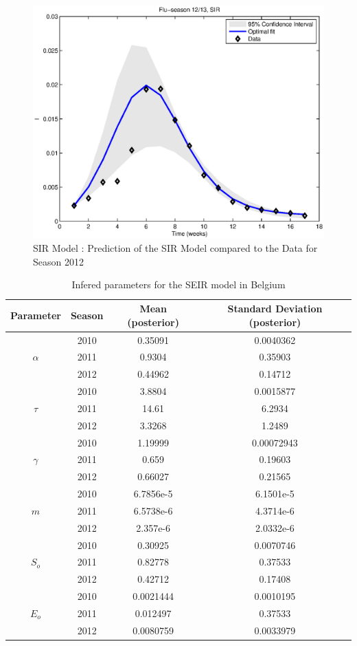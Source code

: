 \documentclass[11pt, a4paper]{article}
\begin{document}
\begin{figure}[h]
    \includegraphics[height = 0.25\textheight]{figures/SIR_prediction_season3.eps}
    \caption{SIR Model : Prediction of the SIR Model compared to the Data for Season 2012}
    \label{fig:sir_pred3}
\end{figure}


\begin{table}[H]
\FloatBarrier
\centering
\begin{tabular}{| c | c | c | c |}
    \hline
    Parameter & Season & Mean (posterior) &  Standard Deviation (posterior)\\ \hline
    \multirow{3}{*}{$\alpha$} & 2010 & 0.35091 & 0.0040362\\
    & 2011 & 0.9304 & 0.35903\\
    & 2012 & 0.44962 & 0.14712 \\ \hline
    \multirow{3}{*}{$\tau$} & 2010 & 3.8804 & 0.0015877 \\ 
    & 2011 & 14.61 & 6.2934 \\
    & 2012 & 3.3268 & 1.2489\\ \hline
    \multirow{3}{*}{$\gamma$} & 2010 & 1.19999 & 0.00072943\\
    & 2011 & 0.659 & 0.19603 \\ 
    & 2012 & 0.66027 & 0.21565 \\ \hline
    \multirow{3}{*}{$m$} & 2010 & 6.7856e-5 & 6.1501e-5 \\ 
    & 2011 & 6.5738e-6 & 4.3714e-6 \\
    & 2012 & 2.357e-6 & 2.0332e-6 \\ \hline
    \multirow{3}{*}{$S_o$} & 2010 & 0.30925 & 0.0070746 \\ 
    & 2011 & 0.82778 & 0.37533 \\ 
    & 2012 & 0.42712 & 0.17408 \\ \hline
    \multirow{3}{*}{$E_o$} & 2010 & 0.0021444 & 0.0010195\\
    & 2011 & 0.012497 & 0.37533 \\ 
    & 2012 & 0.0080759 & 0.0033979 \\ \hline
    \end{tabular}
    \caption{Infered parameters for the SEIR model in Belgium}
    \label{tab:seirDRAM}
\end{table}
\end{document}
